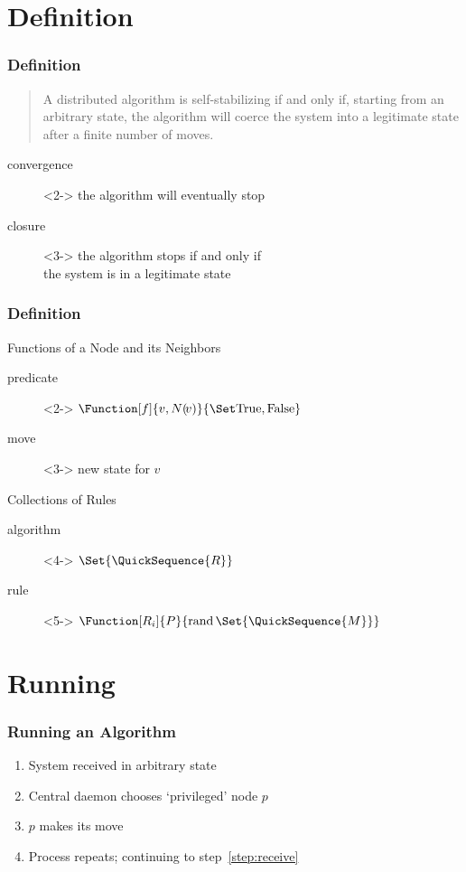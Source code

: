 \documentclass[
]{beamer}
\begin{document}
\section{Definition}
\begin{frame}
  \frametitle{Definition}
  \begin{quote}
    A distributed algorithm is self-stabilizing if and only if,
    starting from an arbitrary state, the algorithm will coerce the
    system into a legitimate state after a \alert<4->{finite} number of
    moves.
  \end{quote}

  \vfill

  \begin{description}
  \item[convergence]<2-> the algorithm will eventually stop
  \item[closure]<3-> the algorithm stops if and only if \\
    the system is in a legitimate state
  \end{description}
\end{frame}
\begin{frame}
  \frametitle{Definition}
  \begin{block}{Functions of a Node and its Neighbors}
    \begin{description}
    \item[predicate]<2-> $\Function[f]{v, N(\!v)}{\SetBoolean}$
    \item[move]<3-> new state for $v$
    \end{description}
  \end{block}
  \begin{block}{Collections of Rules}
    \begin{description}
    \item[algorithm]<4-> $\Set{\QuickSequence{R}}$
    \item[rule]<5-> $\Function[R_i]{P}{
        \operatorname{rand}\Set{\QuickSequence{M}}}$
    \end{description}
  \end{block}
\end{frame}

\section{Running}
\begin{frame}
  \frametitle{Running an Algorithm}
  \begin{enumerate}[<+->]
  \item System received in arbitrary state \label{step:receive}
  \item Central daemon chooses \enquote*{privileged} node $p$
  \item $p$ makes its move
  \item Process repeats; continuing to step~\autoref{step:receive}
  \end{enumerate}
\end{frame}
\end{document}
